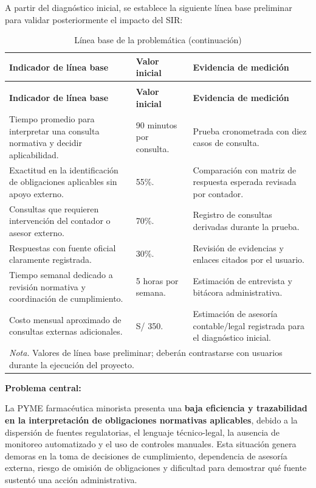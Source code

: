 \documentclass[12pt,a4paper,oneside]{report}
\begin{document}
A partir del diagnóstico inicial, se establece la siguiente línea base preliminar para validar posteriormente el impacto del SIR:

\begin{longtable}{@{}p{}p{}p{}@{}}
\caption{Línea base de la problemática}\label{tab:linea-base-problematica}\\
\toprule
\textbf{Indicador de línea base} & \textbf{Valor inicial} & \textbf{Evidencia de medición} \\
\midrule
\endfirsthead
\caption[]{Línea base de la problemática (continuación)}\\
\toprule
\textbf{Indicador de línea base} & \textbf{Valor inicial} & \textbf{Evidencia de medición} \\
\midrule
\endhead
Tiempo promedio para interpretar una consulta normativa y decidir aplicabilidad. & 90 minutos por consulta. & Prueba cronometrada con diez casos de consulta. \\
Exactitud en la identificación de obligaciones aplicables sin apoyo externo. & 55\%. & Comparación con matriz de respuesta esperada revisada por contador. \\
Consultas que requieren intervención del contador o asesor externo. & 70\%. & Registro de consultas derivadas durante la prueba. \\
Respuestas con fuente oficial claramente registrada. & 30\%. & Revisión de evidencias y enlaces citados por el usuario. \\
Tiempo semanal dedicado a revisión normativa y coordinación de cumplimiento. & 5 horas por semana. & Estimación de entrevista y bitácora administrativa. \\
Costo mensual aproximado de consultas externas adicionales. & S/ 350. & Estimación de asesoría contable/legal registrada para el diagnóstico inicial. \\
\bottomrule
\multicolumn{3}{p{0.94\textwidth}}{\normalsize \textit{Nota.} Valores de línea base preliminar; deberán contrastarse con usuarios durante la ejecución del proyecto.}\\
\end{longtable}

\textbf{Problema central:}

La PYME farmacéutica minorista presenta una \textbf{baja eficiencia y trazabilidad en la interpretación de obligaciones normativas aplicables}, debido a la dispersión de fuentes regulatorias, el lenguaje técnico-legal, la ausencia de monitoreo automatizado y el uso de controles manuales. Esta situación genera demoras en la toma de decisiones de cumplimiento, dependencia de asesoría externa, riesgo de omisión de obligaciones y dificultad para demostrar qué fuente sustentó una acción administrativa.
\end{document}
